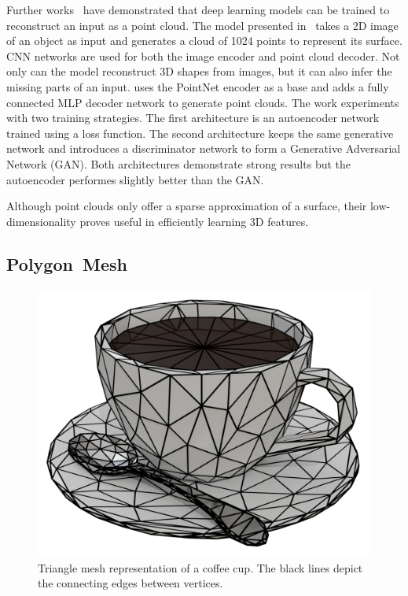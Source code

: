 Further works~\cite{Fan2017, Achlioptas2018} have demonstrated that deep learning models can be trained to reconstruct an input as a point cloud. The model presented in~\cite{Fan2017} takes a 2D image of an object as input and generates a cloud of 1024 points to represent its surface. CNN networks are used for both the image encoder and point cloud decoder. Not only can the model reconstruct 3D shapes from images, but it can also infer the missing parts of an input. \cite{Achlioptas2018} uses the PointNet encoder as a base and adds a fully connected MLP decoder network to generate point clouds. The work experiments with two training strategies. The first architecture is an autoencoder network trained using a loss function. The second architecture keeps the same generative network and introduces a discriminator network to form a Generative Adversarial Network (GAN). Both architectures demonstrate strong results but the autoencoder performes slightly better than the GAN.

Although point clouds only offer a sparse approximation of a surface, their low-dimensionality proves useful in efficiently learning 3D features.


\subsection{Polygon~Mesh}
\label{subsec:polygon_mesh}

\begin{figure}[ht]
	\centering
	\includegraphics[scale=0.2]{Images/Mesh Cup}
	\caption{Triangle mesh representation of a coffee cup. The black lines depict the connecting edges between vertices.}
	\label{fig:mesh_cup}
\end{figure}

